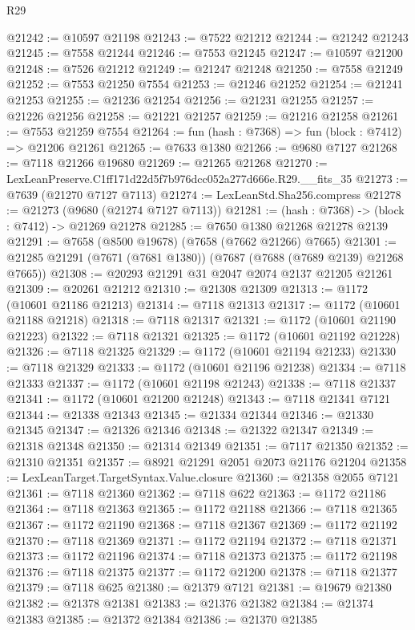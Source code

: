 \begin{lexlean}{R29}
\begin{coremodule}
@21242 := @10597 @21198
@21243 := @7522 @21212
@21244 := @21242 @21243
@21245 := @7558 @21244
@21246 := @7553 @21245
@21247 := @10597 @21200
@21248 := @7526 @21212
@21249 := @21247 @21248
@21250 := @7558 @21249
@21252 := @7553 @21250 @7554
@21253 := @21246 @21252
@21254 := @21241 @21253
@21255 := @21236 @21254
@21256 := @21231 @21255
@21257 := @21226 @21256
@21258 := @21221 @21257
@21259 := @21216 @21258
@21261 := @7553 @21259 @7554
@21264 := fun (hash : @7368) => fun (block : @7412) => @21206 @21261
@21265 := @7633 @1380
@21266 := @9680 @7127
@21268 := @7118 @21266 @19680
@21269 := @21265 @21268
@21270 := LexLeanPreserve.C1ff171d22d5f7b976dcc052a277d666e.R29.__fits_35
@21273 := @7639 (@21270 @7127 @7113)
@21274 := LexLeanStd.Sha256.compress
@21278 := @21273 (@9680 (@21274 @7127 @7113))
@21281 := (hash : @7368) -> (block : @7412) -> @21269 @21278
@21285 := @7650 @1380 @21268 @21278 @2139
@21291 := @7658 (@8500 @19678) (@7658 (@7662 @21266) @7665)
@21301 := @21285 @21291 (@7671 (@7681 @1380)) (@7687 (@7688 (@7689 @2139) @21268 @7665))
@21308 := @20293 @21291 @31 @2047 @2074 @2137 @21205 @21261
@21309 := @20261 @21212
@21310 := @21308 @21309
@21313 := @1172 (@10601 @21186 @21213)
@21314 := @7118 @21313
@21317 := @1172 (@10601 @21188 @21218)
@21318 := @7118 @21317
@21321 := @1172 (@10601 @21190 @21223)
@21322 := @7118 @21321
@21325 := @1172 (@10601 @21192 @21228)
@21326 := @7118 @21325
@21329 := @1172 (@10601 @21194 @21233)
@21330 := @7118 @21329
@21333 := @1172 (@10601 @21196 @21238)
@21334 := @7118 @21333
@21337 := @1172 (@10601 @21198 @21243)
@21338 := @7118 @21337
@21341 := @1172 (@10601 @21200 @21248)
@21343 := @7118 @21341 @7121
@21344 := @21338 @21343
@21345 := @21334 @21344
@21346 := @21330 @21345
@21347 := @21326 @21346
@21348 := @21322 @21347
@21349 := @21318 @21348
@21350 := @21314 @21349
@21351 := @7117 @21350
@21352 := @21310 @21351
@21357 := @8921 @21291 @2051 @2073 @21176 @21204
@21358 := LexLeanTarget.TargetSyntax.Value.closure
@21360 := @21358 @2055 @7121
@21361 := @7118 @21360
@21362 := @7118 @622
@21363 := @1172 @21186
@21364 := @7118 @21363
@21365 := @1172 @21188
@21366 := @7118 @21365
@21367 := @1172 @21190
@21368 := @7118 @21367
@21369 := @1172 @21192
@21370 := @7118 @21369
@21371 := @1172 @21194
@21372 := @7118 @21371
@21373 := @1172 @21196
@21374 := @7118 @21373
@21375 := @1172 @21198
@21376 := @7118 @21375
@21377 := @1172 @21200
@21378 := @7118 @21377
@21379 := @7118 @625
@21380 := @21379 @7121
@21381 := @19679 @21380
@21382 := @21378 @21381
@21383 := @21376 @21382
@21384 := @21374 @21383
@21385 := @21372 @21384
@21386 := @21370 @21385

\end{coremodule}
\end{lexlean}
